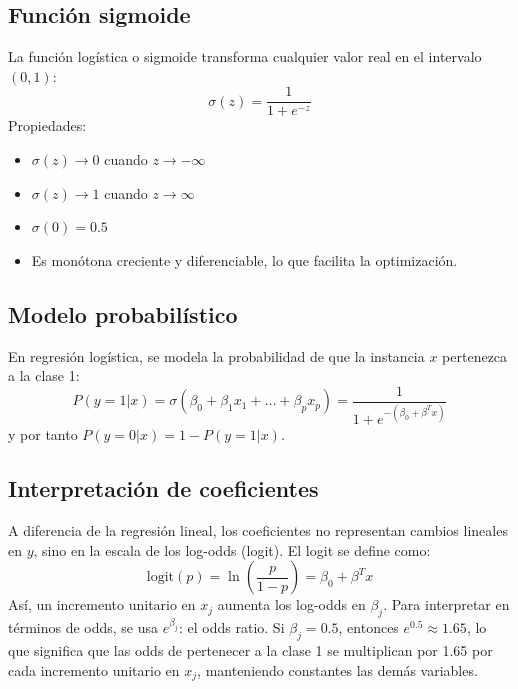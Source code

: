 \documentclass[12pt,a4paper,openany,oneside]{book}
\begin{document}
\subsection{Función sigmoide}
La función logística o sigmoide transforma cualquier valor real en el intervalo \((0,1)\):
\[
\sigma(z) = \frac{1}{1 + e^{-z}}
\]
Propiedades:
\begin{itemize}
    \item \(\sigma(z) \to 0\) cuando \(z \to -\infty\)
    \item \(\sigma(z) \to 1\) cuando \(z \to \infty\)
    \item \(\sigma(0) = 0.5\)
    \item Es monótona creciente y diferenciable, lo que facilita la optimización.
\end{itemize}

\begin{center}
\caption{Función sigmoide.}
\end{center}

\subsection{Modelo probabilístico}
En regresión logística, se modela la probabilidad de que la instancia \(x\) pertenezca a la clase 1:
\[
P(y=1|x) = \sigma(\beta_0 + \beta_1 x_1 + \dots + \beta_p x_p) = \frac{1}{1 + e^{-(\beta_0 + \beta^T x)}}
\]
y por tanto \(P(y=0|x) = 1 - P(y=1|x)\).

\subsection{Interpretación de coeficientes}
A diferencia de la regresión lineal, los coeficientes no representan cambios lineales en \(y\), sino en la escala de los log-odds (logit). El logit se define como:
\[
\text{logit}(p) = \ln\left(\frac{p}{1-p}\right) = \beta_0 + \beta^T x
\]
Así, un incremento unitario en \(x_j\) aumenta los log-odds en \(\beta_j\). Para interpretar en términos de odds, se usa \(e^{\beta_j}\): el odds ratio. Si \(\beta_j = 0.5\), entonces \(e^{0.5} \approx 1.65\), lo que significa que las odds de pertenecer a la clase 1 se multiplican por 1.65 por cada incremento unitario en \(x_j\), manteniendo constantes las demás variables.
\end{document}
